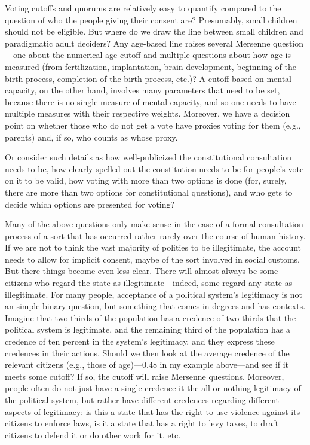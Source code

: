 Voting cutoffs and quorums are relatively easy to quantify compared to the question of who the people giving their consent are?
Presumably, small children should not be eligible. But where do we draw the line between small children and paradigmatic adult
deciders? Any age-based line raises several Mersenne question---one about the numerical age cutoff and multiple questions about 
how age is measured (from fertilization, implantation, brain development, beginning of the birth process, completion of the
birth process, etc.)? A cutoff based on mental capacity, on the other hand, involves many parameters that need to be set, because
there is no single measure of mental capacity, and so one needs to have multiple measures with their respective weights. Moreover,
we have a decision point on whether those who do not get a vote have proxies voting for them (e.g., parents) and, if so, who 
counts as whose proxy.

Or consider such details as how well-publicized the constitutional consultation needs to be, how clearly spelled-out the 
constitution needs to be for people's vote on it to be valid, how voting with more than two options is done (for, surely,
there are more than two options for constitutional questions), and who gets to decide which options are presented for
voting?

Many of the above questions only make sense in the case of a formal consultation process of a sort that has occurred rather
rarely over the course of human history. If we are not to think the vast majority of polities to be illegitimate, the account
needs to allow for implicit consent, maybe of the sort involved in social customs. But there things become even less clear.
There will almost always be some citizens who regard the state as illegitimate---indeed, some regard any state 
as illegitimate. For many people, acceptance of a political system's legitimacy is not an simple binary question, but 
something that comes in degrees and has contexts. Imagine that two thirds of the population has a credence of two thirds
that the political system is legitimate, and the remaining third of the population has a credence of ten percent in 
the system's legitimacy, and they express these credences in their actions. Should we then look at the average credence
of the relevant citizens (e.g., those of age)---$0.48$ in my example above---and see if it meets some cutoff? If so, the
cutoff will raise Mersenne questions. Moreover, people often do not just have a single credence it the all-or-nothing 
legitimacy of the political system, but rather have different credences regarding different aspects of legitimacy: is this
a state that has the right to use violence against its citizens to enforce laws, is it a state that has a right to levy taxes,
to draft citizens to defend it or do other work for it, etc.

